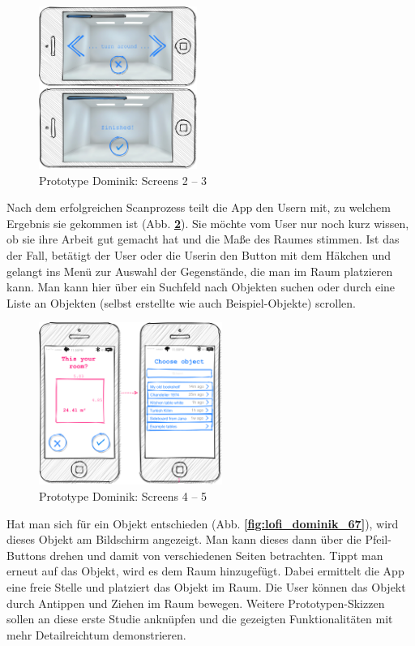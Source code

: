 \documentclass[12pt,paper=a4,oneside,hidelinks,headings=small,captions=heading,captions=nooneline]{scrartcl}
\begin{document}
\begin{figure}[htbp]
\centering
\includegraphics[height=200px]{./img/m2_lofi_dominik_23.png}
\caption{\label{fig:lofi_dominik_23}Prototype Dominik: Screens 2 -- 3}
\end{figure}

Nach dem erfolgreichen Scanprozess teilt die App den Usern mit, zu
welchem Ergebnis sie gekommen ist (Abb. \textbf{\ref{fig:lofi_dominik_45}}). Sie
möchte vom User nur noch kurz wissen, ob sie ihre Arbeit gut gemacht
hat und die Maße des Raumes stimmen. Ist das der Fall, betätigt der
User oder die Userin den Button mit dem Häkchen und gelangt ins Menü
zur Auswahl der Gegenstände, die man im Raum platzieren kann. Man kann
hier über ein Suchfeld nach Objekten suchen oder durch eine Liste an
Objekten (selbst erstellte wie auch Beispiel-Objekte) scrollen.

\begin{figure}[htbp]
\centering
\includegraphics[height=200px]{./img/m2_lofi_dominik_45.png}
\caption{\label{fig:lofi_dominik_45}Prototype Dominik: Screens 4 -- 5}
\end{figure}

Hat man sich für ein Objekt entschieden (Abb. \textbf{\ref{fig:lofi_dominik_67}}),
wird dieses Objekt am Bildschirm angezeigt. Man kann dieses dann über
die Pfeil-Buttons drehen und damit von verschiedenen Seiten
betrachten. Tippt man erneut auf das Objekt, wird es dem Raum
hinzugefügt. Dabei ermittelt die App eine freie Stelle und platziert
das Objekt im Raum. Die User können das Objekt durch Antippen und
Ziehen im Raum bewegen. Weitere Prototypen-Skizzen sollen an diese
erste Studie anknüpfen und die gezeigten Funktionalitäten mit mehr
Detailreichtum demonstrieren.
\end{document}
